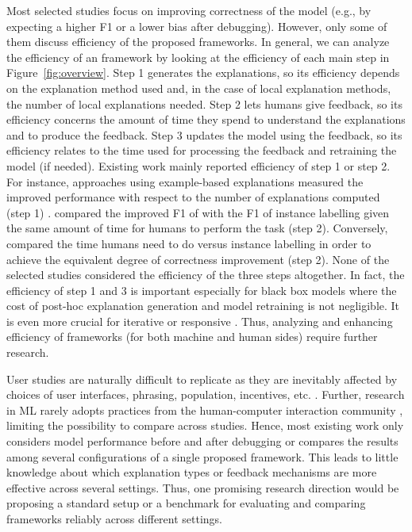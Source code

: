 Most selected studies focus on improving correctness of the model (e.g., by expecting a higher F1 or a lower bias after debugging).
However, 
only some of them discuss efficiency of the proposed frameworks.
In general, we can analyze the efficiency of an \EBHD framework by looking at the efficiency of each main step in Figure~\ref{fig:overview}.
Step 1 generates the explanations, so its efficiency depends on the explanation method used and, in the case of local explanation methods, the number of local explanations needed.
Step 2 lets humans give feedback, so its efficiency concerns the amount of time they spend to understand the explanations and to produce the feedback.
Step 3 updates the model using the feedback, so its efficiency relates to the time used for processing the feedback and retraining the model (if needed).
Existing work mainly reported efficiency of step 1 or step 2.
For instance, approaches using example-based explanations 
measured the improved performance with respect to the number of explanations computed (step 1) . 
 compared the improved F1 of \EBHD with the F1 of instance labelling given the same amount of time for humans to perform the task (step 2).
Conversely,  compared the time humans need to do \EBHD versus instance labelling in order to achieve the equivalent degree of correctness improvement (step 2).
None of the selected studies considered the efficiency of the three steps altogether. In fact, the efficiency of step 1 and 3 is important especially for black box models where the cost of post-hoc explanation generation and model retraining is not negligible. 
It is even more crucial for iterative or responsive \EBHD.
Thus, analyzing and enhancing efficiency of \EBHD frameworks (for both  machine  and  human sides) require further research.

User studies 
are naturally difficult to replicate as they are inevitably affected by choices of user interfaces, phrasing, population, incentives, etc. .
Further, research in ML rarely 
adopts practices from the human-computer interaction community , limiting the possibility to compare across studies.
Hence, most existing work only considers model performance before and after debugging or compares the results among several configurations of a single proposed framework.
This leads to little knowledge 
about which explanation types or feedback mechanisms are more effective across several settings.
Thus, one promising research direction would be proposing a standard setup or a benchmark for
evaluating and comparing \EBHD frameworks 
reliably across different settings.

